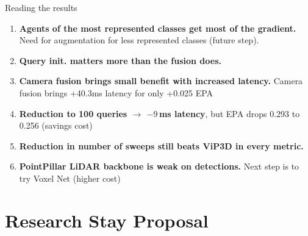 \documentclass[aspectratio=169,11pt,t]{beamer}
\begin{document}
\begin{frame}{Reading the results}
  \begin{enumerate}
    \item \textbf{Agents of the most represented classes get most of the gradient.}
    Need for augmentation for less represented classes (future step).
    \item \textbf{Query init. matters more than the fusion does.} 
  \vspace{+0.4em}

    \item \textbf{Camera fusion brings small benefit with increased latency.}
    Camera fusion brings +40.3ms latency for only +0.025 EPA
  \vspace{+0.4em}

    \item \textbf{Reduction to 100 queries $\to$ $-9$\,ms latency},
      but EPA drops 0.293 to 0.256 (savings cost)
  \vspace{+0.4em}

    \item \textbf{Reduction in number of sweeps \alert{still beats ViP3D in every metric}.}
  \vspace{+0.4em}

    \item \textbf{PointPillar LiDAR backbone is weak on detections.}
    Next step is to try Voxel Net (higher cost)


  \end{enumerate}
\end{frame}



\section{Research Stay Proposal}
\end{document}
